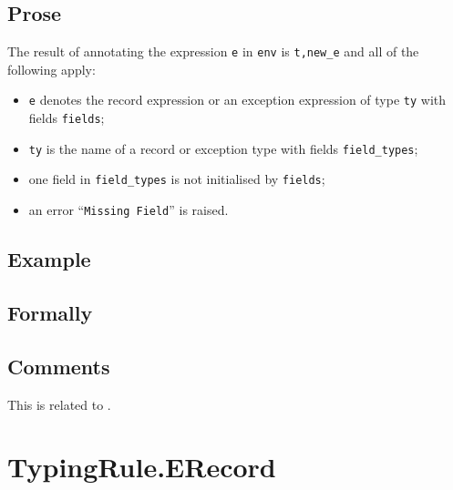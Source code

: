 \documentclass{book}
\begin{document}
\begin{itemize}
  \subsection{Prose}
  The result of annotating the expression \texttt{e} in \texttt{env} is
\texttt{t,new\_e} and all of the following apply:
  \begin{itemize}
  \item \texttt{e} denotes the record expression or an exception expression of type \texttt{ty} with fields \texttt{fields};
  \item \texttt{ty} is the name of a record or exception type with fields \texttt{field\_types};
  \item one field in \texttt{field\_types} is not initialised by \texttt{fields};
  \item an error ``\texttt{Missing Field}'' is raised.
  \end{itemize}

  \subsection{Example}



\begin{emptyformal}
    \subsection{Formally}

\end{emptyformal}

\subsection{Comments}
  This is related to .

\section{TypingRule.ERecord \label{sec:TypingRule.ERecord}}


\end{itemize}
\end{document}

